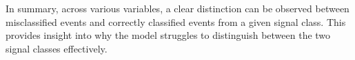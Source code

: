 In summary, across various variables, a clear distinction can be observed between misclassified events and correctly classified events from a given signal class. This provides insight into why
the model struggles to distinguish between the two signal classes effectively. \\


